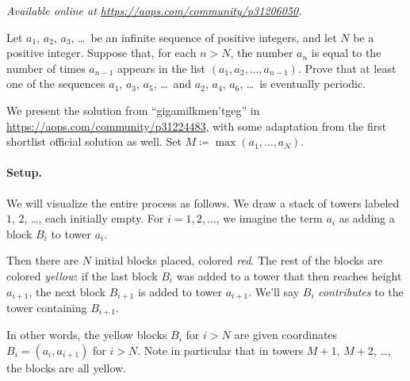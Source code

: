 \textsl{Available online at \url{https://aops.com/community/p31206050}.}
\begin{mdframed}[style=mdpurplebox,frametitle={Problem statement}]
Let $a_1$, $a_2$, $a_3$, \dots\ be an infinite sequence of positive integers,
and let $N$ be a positive integer.
Suppose that, for each $n > N$,
the number $a_n$ is equal to the number of times $a_{n-1}$ appears
in the list $(a_1, a_2, \dots, a_{n-1})$.
Prove that at least one of the sequences $a_1$, $a_3$, $a_5$, \dots\
and $a_2$, $a_4$, $a_6$, \dots\ is eventually periodic.
\end{mdframed}
We present the solution from ``gigamilkmen'tgeg''
in \url{https://aops.com/community/p31224483},
with some adaptation from the first shortlist official solution as well.
Set $M \coloneqq \max(a_1, \dots, a_N)$.

\paragraph{Setup.}
We will visualize the entire process as follows.
We draw a stack of towers labeled $1$, $2$, \dots, each initially empty.
For $i=1,2,\dots$, we imagine the term $a_i$ as adding a block $B_i$ to tower $a_i$.

Then there are $N$ initial blocks placed, colored \emph{red}.
The rest of the blocks are colored \emph{yellow}:
if the last block $B_i$ was added to a tower that then reaches height $a_{i+1}$,
the next block $B_{i+1}$ is added to tower $a_{i+1}$.
We'll say $B_i$ \emph{contributes} to the tower containing $B_{i+1}$.

In other words, the yellow blocks $B_i$ for $i > N$
are given coordinates $B_i = (a_i, a_{i+1})$ for $i>N$.
Note in particular that in towers $M+1$, $M+2$, \dots, the blocks are all yellow.

